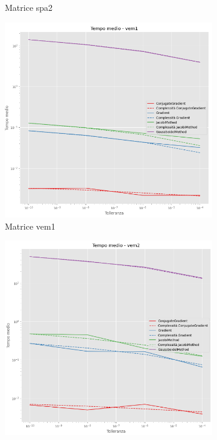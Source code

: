 \begin{figure}[!ht]
\begin{subfigure}{0.45\textwidth}
        \caption{Matrice spa2}
        \label{fig:time_spa2}
    \end{subfigure}
    \hfill
    \begin{subfigure}{0.45\textwidth}
        \centering
        \includegraphics[width=\textwidth]{./../report/Progetto_1_bis/img/time_vem1.png}
        \caption{Matrice vem1}
        \label{fig:time_vem1}
    \end{subfigure}
    \hfill
    \begin{subfigure}{0.45\textwidth}
        \centering
        \includegraphics[width=\textwidth]{./../report/Progetto_1_bis/img/time_vem2.png}

\end{subfigure}
\end{figure}
